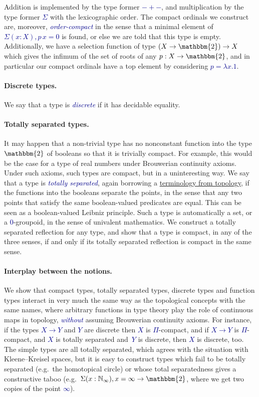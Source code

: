 \documentclass[a4paper]{easychair}
\newcommand{\db}{\textcolor{darkblue}}
\newcommand{\df}[1]{\emph{\db{#1}}}
\newcommand{\m}[1]{\db{$#1$}}
\newcommand{\N}{\mathbb{N}}
\newcommand{\NI}{\N_\infty}
\newcommand{\Two}{\mathbbm{2}}
\begin{document}
Addition is implemented by the type former \m{-+-}, and multiplication
by the type former \m{\Sigma} with the lexicographic order. The
compact ordinals we construct are, moreover, \df{order-compact} in the
sense that a minimal element of \m{\Sigma (x : X), p\,x = 0} is found,
or else we are told that this type is empty.  Additionally, we have a
selection function of type \m{(X \to \Two) \to X} which gives the
infimum of the set of roots of any \m{p : X \to \Two}, and in
particular our compact ordinals have a top element by considering \m{p
  = \lambda x. 1}.

\paragraph{Discrete types.}
We say that a type is \df{discrete} if it has decidable equality.

\paragraph{Totally separated types.}
It may happen that a non-trivial type has no nonconstant function into
the type \m{\Two} of booleans so that it is trivially compact. For
example, this would be the case for a type of real numbers
under Brouwerian continuity axioms. Under such axioms, such types are
compact, but in a uninteresting way. We say that a type is \df{totally
  separated}, again borrowing a
\href{https://www.encyclopediaofmath.org/index.php/Totally_separated_space}{terminology
  from topology}, if the functions into the booleans separate the
points, in the sense that any two points that satisfy the same boolean-valued
predicates are equal. This can be seen as a boolean-valued Leibniz principle. Such a type is automatically a set, or a
\m{0}-groupoid, in the sense of univalent mathematics. We construct a
totally separated reflection for any type, and show that a type is
compact, in any of the three senses, if and only if its totally
separated reflection is compact in the same sense.

\paragraph{Interplay between the notions.}
We show that compact types, totally separated types, discrete types
and function types interact in very much the same way as the
topological concepts with the same names, where arbitrary functions in
type theory play the role of continuous maps in topology, \df{without}
assuming Brouwerian continuity axioms. For instance, if the types \m{X
  \to Y} and \m{Y} are discrete then \m{X} is \m{\Pi}-compact, and if
\m{X \to Y} is \m{\Pi}-compact, and \m{X} is totally separated
and~\m{Y} is discrete, then \m{X} is discrete, too. The simple types
are all totally separated, which agrees with the situation with
Kleene--Kreisel spaces, but it is easy to construct types which fail
to be totally separated (e.g.\ the homotopical circle) or whose total
separatedness gives a constructive taboo (e.g.\ \m{\Sigma (x : \NI), x =
  \infty \to \Two}, where we get two copies of the point \m{\infty}).
\end{document}
